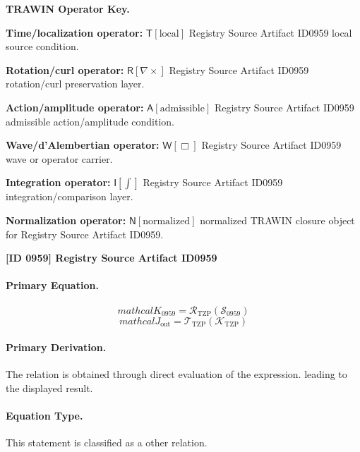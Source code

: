 \par\vspace{0.45\baselineskip}
\noindent\begin{minipage}[t]{\linewidth}
\begingroup
\small
\raggedright
\textbf{TRAWIN Operator Key.}\par
\noindent\textbf{Time/localization operator:} $\mathsf{T}\!\left[\mathrm{local}\right]$ Registry Source Artifact ID0959 local source condition.\par
\noindent\textbf{Rotation/curl operator:} $\mathsf{R}\!\left[\nabla\times\right]$ Registry Source Artifact ID0959 rotation/curl preservation layer.\par
\noindent\textbf{Action/amplitude operator:} $\mathsf{A}\!\left[\mathrm{admissible}\right]$ Registry Source Artifact ID0959 admissible action/amplitude condition.\par
\noindent\textbf{Wave/d'Alembertian operator:} $\mathsf{W}\!\left[\Box\right]$ Registry Source Artifact ID0959 wave or operator carrier.\par
\noindent\textbf{Integration operator:} $\mathsf{I}\!\left[\int\right]$ Registry Source Artifact ID0959 integration/comparison layer.\par
\noindent\textbf{Normalization operator:} $\mathsf{N}\!\left[\mathrm{normalized}\right]$ normalized TRAWIN closure object for Registry Source Artifact ID0959.\par
\endgroup
\end{minipage}

\clearpage
\noindent\textbf{[ID 0959] Registry Source Artifact ID0959}\par
\vspace{0.35em}
\paragraph{Primary Equation.}
\[
mathcal{K}_{0959}=\mathcal{R}_{\mathrm{TZP}}\!\left(\mathcal{S}_{0959}\right)
\]
\[
mathcal{J}_{\mathrm{out}} = \mathcal{T}_{\mathrm{TZP}}\!\left(\mathcal{K}_{\mathrm{TZP}}\right)
\]

\paragraph{Primary Derivation.}
The relation is obtained through direct evaluation of the expression. leading to the displayed result.
\paragraph{Equation Type.}
This statement is classified as a other relation.

